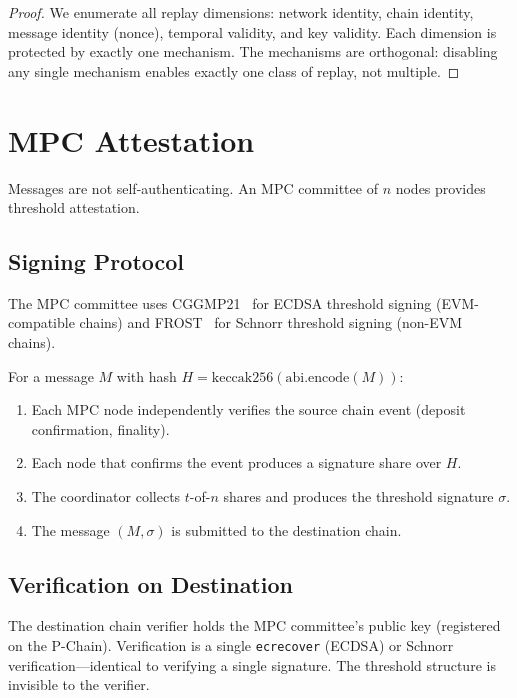 \documentclass[11pt,a4paper]{article}
\begin{document}
\begin{proof}
We enumerate all replay dimensions: network identity, chain identity, message identity (nonce), temporal validity, and key validity. Each dimension is protected by exactly one mechanism. The mechanisms are orthogonal: disabling any single mechanism enables exactly one class of replay, not multiple.
\end{proof}

\section{MPC Attestation}

Messages are not self-authenticating. An MPC committee of $n$ nodes provides threshold attestation.

\subsection{Signing Protocol}

The MPC committee uses CGGMP21~\cite{cggmp2021} for ECDSA threshold signing (EVM-compatible chains) and FROST~\cite{frost2020} for Schnorr threshold signing (non-EVM chains).

For a message $M$ with hash $H = \text{keccak256}(\text{abi.encode}(M))$:

\begin{enumerate}[leftmargin=2em]
\item Each MPC node independently verifies the source chain event (deposit confirmation, finality).
\item Each node that confirms the event produces a signature share over $H$.
\item The coordinator collects $t$-of-$n$ shares and produces the threshold signature $\sigma$.
\item The message $(M, \sigma)$ is submitted to the destination chain.
\end{enumerate}

\subsection{Verification on Destination}

The destination chain verifier holds the MPC committee's public key (registered on the P-Chain). Verification is a single \texttt{ecrecover} (ECDSA) or Schnorr verification---identical to verifying a single signature. The threshold structure is invisible to the verifier.
\end{document}
